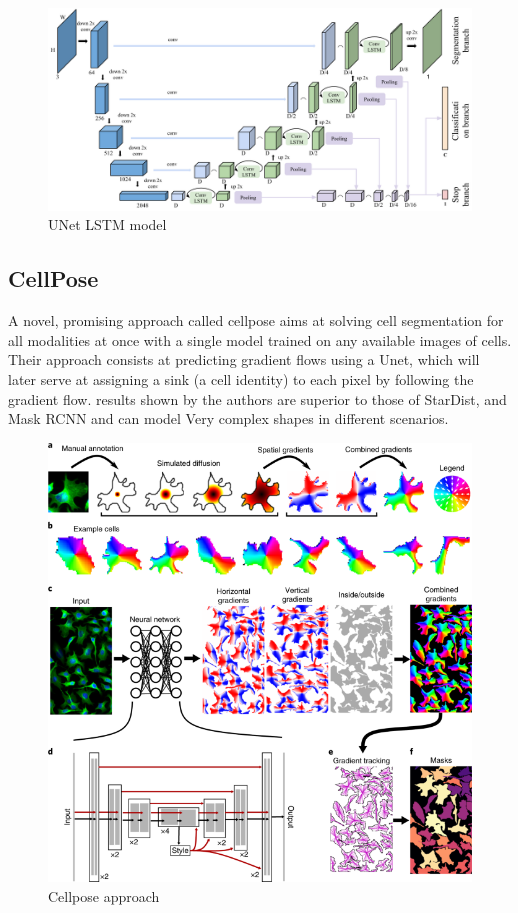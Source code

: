 \documentclass[main.tex]{subfiles}
\begin{document}
\begin{figure}[H]
    \centering
    \includegraphics[width=16cm]{images/unetlstm.png}
    \caption{UNet LSTM model}
    \label{fig:cnnlstm}
\end{figure}


\subsection{CellPose} A novel, promising approach called cellpose \cite{Stringer2020} aims at solving cell segmentation for all modalities at once with a single model trained on any available images of cells. Their approach consists at predicting gradient flows using a Unet, which will later serve at assigning a sink (a cell identity) to each pixel by following the gradient flow. results shown by the authors are superior to those of StarDist, and Mask RCNN and can model Very complex shapes in different scenarios.

\begin{figure}[H]
    \centering
    \includegraphics[width=14cm]{images/cellpose.png}
    \caption{Cellpose approach}
    \label{fig:ac}
\end{figure}
\end{document}

